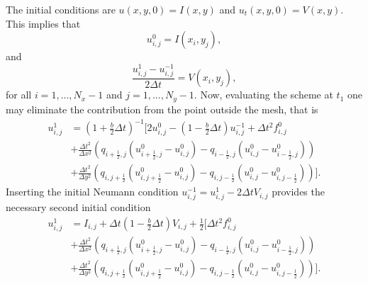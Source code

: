 \documentclass[11pt]{article}
\begin{document}
The initial conditions are $u(x,y,0)= I(x,y)$ and $u_t(x,y,0)=V(x,y)$. This implies that
\begin{equation}
u_{i,j}^0 = I(x_i, y_j), 
\end{equation}
 and
 \begin{equation*}
 \frac{u_{i,j}^{1} - u_{i,j}^{-1}}{2 \Delta t} = V(x_i,y_j),
 \end{equation*}
 for all  $i=1, ..., N_x - 1$ and $j=1, ..., N_y - 1$.
 Now, evaluating the scheme at $t_1$ one may eliminate the contribution from the point outside the mesh, that is
\begin{align*}
u_{i,j}^{1} &= (1+\frac{b}{2}\Delta t)^{-1} \bigg[2u_{i,j}^0 - (1-\frac{b}{2}\Delta t) u_{i,j}^{-1} + \Delta t^2 f_{i,j}^0 \nonumber \\
&+ \frac{\Delta t^2}{\Delta x^2} \left(q_{i+\frac{1}{2},j} (u_{i+\frac{1}{2},j}^0 - u_{i,j}^0) -  q_{i-\frac{1}{2},j} (u_{i,j}^0 - u_{i-\frac{1}{2},j}^0) \right) \\
&+ \frac{\Delta t^2}{\Delta y^2} \left(q_{i,j+\frac{1}{2}} (u_{i,j+\frac{1}{2}}^0 - u_{i,j}^0) -  q_{i,j-\frac{1}{2}} (u_{i,j}^0 - u_{i,j-\frac{1}{2}}^0) \right) \bigg]. \nonumber
\end{align*}
Inserting the initial Neumann condition $u_{i,j}^{-1} = u_{i,j}^1 - 2\Delta t V_{i,j}$ provides the necessary second initial condition
\begin{align}
u_{i,j}^1 &= I_{i,j} + \Delta t(1- \frac{b}{2} \Delta t) V_{i,j} + \frac{1}{2} \bigg[\Delta t^2 f_{i,j}^0 \nonumber \\
&+ \frac{\Delta t^2}{\Delta x^2} \left(q_{i+\frac{1}{2},j} (u_{i+\frac{1}{2},j}^0 - u_{i,j}^0) -  q_{i-\frac{1}{2},j} (u_{i,j}^0 - u_{i-\frac{1}{2},j}^0) \right) \\
&+ \frac{\Delta t^2}{\Delta y^2} \left(q_{i,j+\frac{1}{2}} (u_{i,j+\frac{1}{2}}^0 - u_{i,j}^0) -  q_{i,j-\frac{1}{2}} (u_{i,j}^0 - u_{i,j-\frac{1}{2}}^0) \right) \bigg]. \nonumber
\end{align}
\end{document}
